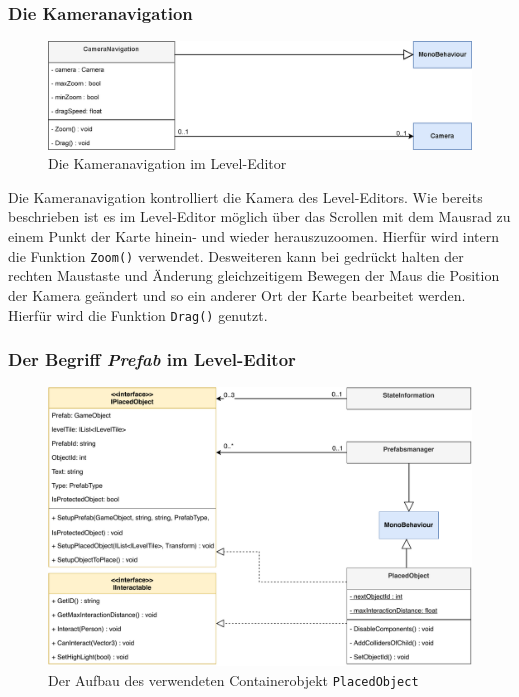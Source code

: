\subsubsection{Die Kameranavigation}
\begin {figure}[h]
	\begin {center}
	    \includegraphics[width=1\textwidth]{pics/leveleditor_cameranavigation.eps}
		\caption{Die Kameranavigation im Level-Editor}
		\label{fig:leveleditor_cameranavigation}
	\end {center}
\end {figure}
Die Kameranavigation kontrolliert die Kamera des Level-Editors. Wie bereits beschrieben ist es im Level-Editor möglich über das Scrollen mit dem Mausrad zu einem Punkt der Karte hinein- und wieder herauszuzoomen. Hierfür wird intern die Funktion \texttt{Zoom()} verwendet. Desweiteren kann bei gedrückt halten der rechten Maustaste und Änderung gleichzeitigem Bewegen der Maus die Position der Kamera geändert und so ein anderer Ort der Karte bearbeitet werden. Hierfür wird die Funktion \texttt{Drag()} genutzt.


\subsubsection{Der Begriff \textit{Prefab} im Level-Editor}
\begin {figure}[h]
	\begin {center}
	    \includegraphics[width=1\textwidth]{pics/leveleditor_placedobject.pdf}
		\caption{Der Aufbau des verwendeten Containerobjekt \texttt{PlacedObject}}
		\label{fig:leveleditor_placedobject}
	\end {center}
\end {figure}

